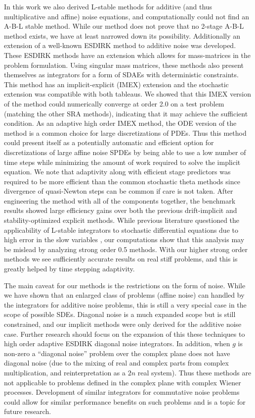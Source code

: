 \documentclass{article}
\begin{document}
In this work we also derived L-stable methods for additive (and thus
multiplicative and affine) noise equations, and computationally could
not find an A-B-L stable method. While our method does not prove that
no 2-stage A-B-L method exists, we have at least narrowed down its
possibility. Additionally an extension of a well-known ESDIRK method
to additive noise was developed. These ESDIRK methods have an extension
which allows for mass-matrices in the problem formulation. Using singular
mass matrices, these methods also present themselves as integrators
for a form of SDAEs with deterministic constraints. This method has
an implicit-explicit (IMEX) extension and the stochastic extension
was compatible with both tableaus. We showed that this IMEX version
of the method could numerically converge at order 2.0 on a test problem
(matching the other SRA methods), indicating that it may achieve the
sufficient condition. As an adaptive high order IMEX method, the ODE
version of the method is a common choice for large discretizations
of PDEs. Thus this method could present itself as a potentially automatic
and efficient option for discretizations of large affine noise SPDEs
by being able to use a low number of time steps while minimizing the
amount of work required to solve the implicit equation. We note that
adaptivity along with efficient stage predictors was required to be
more efficient than the common stochastic theta methods since divergence
of quasi-Newton steps can be common if care is not taken. After engineering
the method with all of the components together, the benchmark results
showed large efficiency gains over both the previous drift-implicit
and stability-optimized explicit methods. While previous literature
questioned the applicability of L-stable integrators to stochastic
differential equations due to high error in the slow variables \cite{RN3811},
our computations show that this analysis may be mislead by analyzing
strong order 0.5 methods. With our higher strong order methods we
see sufficiently accurate results on real stiff problems, and this
is greatly helped by time stepping adaptivity.

The main caveat for our methods is the restrictions on the form of
noise. While we have shown that an enlarged class of problems (affine
noise) can handled by the integrators for additive noise problems,
this is still a very special case in the scope of possible SDEs. Diagonal
noise is a much expanded scope but is still constrained, and our implicit
methods were only derived for the additive noise case. Further research
should focus on the expansion of this these techniques to high order
adaptive ESDIRK diagonal noise integrators. In addition, when $g$
is non-zero a ``diagonal noise'' problem over the complex plane
does not have diagonal noise (due to the mixing of real and complex
parts from complex multiplication, and reinterpretation as a $2n$
real system). Thus these methods are not applicable to problems defined
in the complex plane with complex Wiener processes. Development of
similar integrators for commutative noise problems could allow for
similar performance benefits on such problems and is a topic for future
research.
\end{document}
